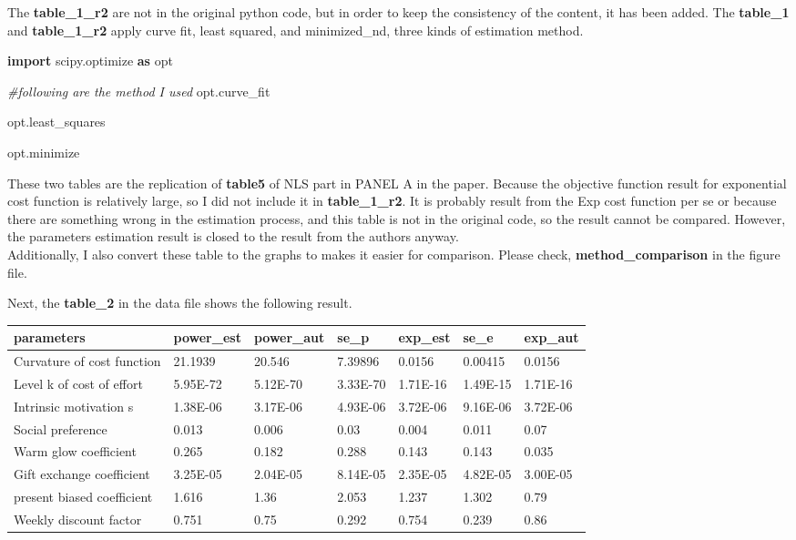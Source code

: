 \documentclass[11pt
]{article}
\newenvironment{Shaded}{}{}
\newcommand{\CommentTok}[1]{\textcolor[rgb]{0.38,0.63,0.69}{\textit{#1}}}
\newcommand{\ImportTok}[1]{\textcolor[rgb]{0.00,0.50,0.00}{\textbf{#1}}}
\newcommand{\NormalTok}[1]{#1}
\begin{document}
The \textbf{table\_1\_r2} are not in the original python code, but in
order to keep the consistency of the content, it has been added. The
\textbf{table\_1} and \textbf{table\_1\_r2} apply curve fit, least
squared, and minimized\_nd, three kinds of estimation method.

\begin{Shaded}
\begin{Highlighting}[]
\ImportTok{import}\NormalTok{ scipy.optimize }\ImportTok{as}\NormalTok{ opt
}
\CommentTok{\#following are the method I used
}
\NormalTok{opt.curve\_fit
}
\NormalTok{opt.least\_squares
}
\NormalTok{opt.minimize}
\end{Highlighting}
\end{Shaded}

These two tables are the replication of \textbf{table5 }of NLS part in
PANEL A in the paper. Because the objective function result for exponential
cost function is relatively large, so I did not include it in
\textbf{table\_1\_r2}. It is probably result from the Exp cost function
per se or because there are something wrong in the estimation process,
and this table is not in the original code, so the result cannot be
compared. However, the parameters estimation result is closed to the
result from the authors anyway.\\
Additionally, I also convert these table to the graphs to makes it
easier for comparison. Please check, \textbf{method\_comparison} in the
figure file.

Next, the \textbf{table\_2} in the data file shows the following result.

\begin{longtable}[]{@{}lllllll@{}}
\toprule()
parameters & power\_est & power\_aut & se\_p & exp\_est & se\_e &
exp\_aut \\
\midrule()
\endhead
Curvature of cost function & 21.1939 & 20.546 & 7.39896 & 0.0156 &
0.00415 & 0.0156 \\
Level k of cost of effort & 5.95E-72 & 5.12E-70 & 3.33E-70 & 1.71E-16 &
1.49E-15 & 1.71E-16 \\
Intrinsic motivation s & 1.38E-06 & 3.17E-06 & 4.93E-06 & 3.72E-06 &
9.16E-06 & 3.72E-06 \\
Social preference & 0.013 & 0.006 & 0.03 & 0.004 & 0.011 & 0.07 \\
Warm glow coefficient & 0.265 & 0.182 & 0.288 & 0.143 & 0.143 & 0.035 \\
Gift exchange coefficient & 3.25E-05 & 2.04E-05 & 8.14E-05 & 2.35E-05 &
4.82E-05 & 3.00E-05 \\
present biased coefficient & 1.616 & 1.36 & 2.053 & 1.237 & 1.302 &
0.79 \\
Weekly discount factor & 0.751 & 0.75 & 0.292 & 0.754 & 0.239 & 0.86 \\
\bottomrule()
\end{longtable}
\end{document}
